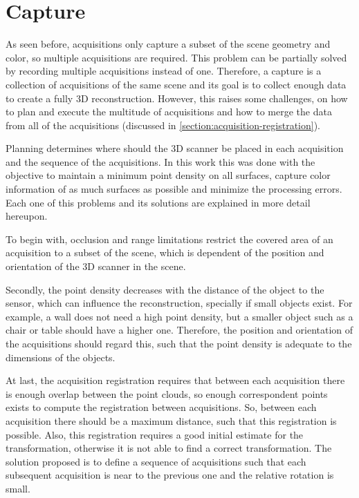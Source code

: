 \section{Capture}
\label{section:capture}

As seen before, acquisitions only capture a subset of the scene geometry and color, so multiple acquisitions are required. This problem can be partially solved by recording multiple acquisitions instead of one. Therefore, a capture is a collection of acquisitions of the same scene and its goal is to collect enough data to create a fully 3D reconstruction. However, this raises some challenges, on how to plan and execute the multitude of acquisitions and how to merge the data from all of the acquisitions (discussed in \cref{section:acquisition-registration}).

Planning determines where should the 3D scanner be placed in each acquisition and the sequence of the acquisitions. In this work this was done with the objective to maintain a minimum point density on all surfaces, capture color information of as much surfaces as possible and minimize the processing errors. Each one of this problems and its solutions are explained in more detail hereupon.

To begin with, occlusion and range limitations restrict the covered area of an acquisition to a subset of the scene, which is dependent of the position and orientation of the 3D scanner in the scene.

Secondly, the point density decreases with the distance of the object to the sensor, which can influence the reconstruction, specially if small objects exist. For example, a wall does not need a high point density, but a smaller object such as a chair or table should have a higher one. Therefore, the position and orientation of the acquisitions should regard this, such that the point density is adequate to the dimensions of the objects.

At last, the acquisition registration requires that between each acquisition there is enough overlap between the point clouds, so enough correspondent points exists to compute the registration between acquisitions. So, between each acquisition there should be a maximum distance, such that this registration is possible. Also, this registration requires a good initial estimate for the transformation, otherwise it is not able to find a correct transformation. The solution proposed is to define a sequence of acquisitions such that each subsequent acquisition is near to the previous one and the relative rotation is small.

